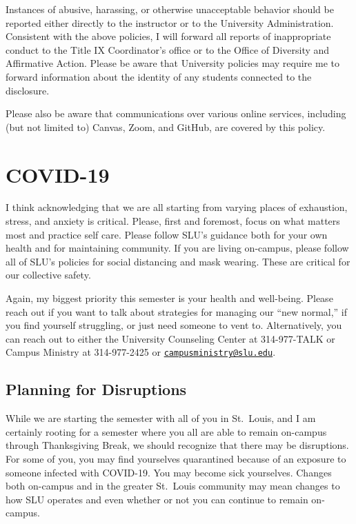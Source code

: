 \documentclass[
]{book}
\begin{document}
Instances of abusive, harassing, or otherwise unacceptable behavior should be reported either directly to the instructor or to the University Administration. Consistent with the above policies, I will forward all reports of inappropriate conduct to the Title IX Coordinator's office or to the Office of Diversity and Affirmative Action. Please be aware that University policies may require me to forward information about the identity of any students connected to the disclosure.

Please also be aware that communications over various online services, including (but not limited to) Canvas, Zoom, and GitHub, are covered by this policy.

\hypertarget{covid-19}{%
\section{COVID-19}\label{covid-19}}

I think acknowledging that we are all starting from varying places of exhaustion, stress, and anxiety is critical. Please, first and foremost, focus on what matters most and practice self care. Please follow SLU's guidance both for your own health and for maintaining community. If you are living on-campus, please follow all of SLU's policies for social distancing and mask wearing. These are critical for our collective safety.

Again, my biggest priority this semester is your health and well-being. Please reach out if you want to talk about strategies for managing our ``new normal,'' if you find yourself struggling, or just need someone to vent to. Alternatively, you can reach out to either the University Counseling Center at 314-977-TALK or Campus Ministry at 314-977-2425 or \href{mailto:campusministry@slu.edu}{\nolinkurl{campusministry@slu.edu}}.

\hypertarget{planning-for-disruptions}{%
\subsection{Planning for Disruptions}\label{planning-for-disruptions}}

While we are starting the semester with all of you in St.~Louis, and I am certainly rooting for a semester where you all are able to remain on-campus through Thanksgiving Break, we should recognize that there may be disruptions. For some of you, you may find yourselves quarantined because of an exposure to someone infected with COVID-19. You may become sick yourselves. Changes both on-campus and in the greater St.~Louis community may mean changes to how SLU operates and even whether or not you can continue to remain on-campus.
\end{document}
